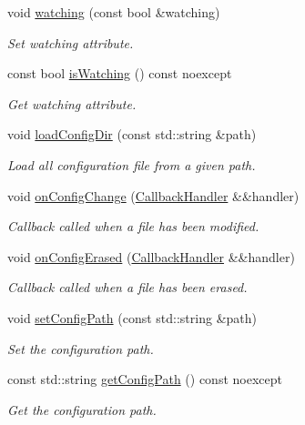 \begin{DoxyCompactItemize}
void \hyperlink{classcfg_1_1_config_manager_a5c6d63489274c7ddeb88891caea5ca48}{watching} (const bool \&watching)
\begin{DoxyCompactList}\small\item\em Set watching attribute. \end{DoxyCompactList}\item 
const bool \hyperlink{classcfg_1_1_config_manager_a704e8f6b81715a24199f3579a946cad4}{is\+Watching} () const noexcept
\begin{DoxyCompactList}\small\item\em Get watching attribute. \end{DoxyCompactList}\item 
void \hyperlink{classcfg_1_1_config_manager_ad6c55b0413f949cc5002467cbcee3186}{load\+Config\+Dir} (const std\+::string \&path)
\begin{DoxyCompactList}\small\item\em Load all configuration file from a given path. \end{DoxyCompactList}\item 
void \hyperlink{classcfg_1_1_config_manager_a324ba63493aefb579500f7338bd477db}{on\+Config\+Change} (\hyperlink{classcfg_1_1_config_manager_a6614f22d32db38ce6d6ed5b351d4f628}{Callback\+Handler} \&\&handler)
\begin{DoxyCompactList}\small\item\em Callback called when a file has been modified. \end{DoxyCompactList}\item 
void \hyperlink{classcfg_1_1_config_manager_abee2ba9f508be9604bf91d7f90691bcf}{on\+Config\+Erased} (\hyperlink{classcfg_1_1_config_manager_a6614f22d32db38ce6d6ed5b351d4f628}{Callback\+Handler} \&\&handler)
\begin{DoxyCompactList}\small\item\em Callback called when a file has been erased. \end{DoxyCompactList}\item 
void \hyperlink{classcfg_1_1_config_manager_adf39406f57dfd1871ee974dd86d16abc}{set\+Config\+Path} (const std\+::string \&path)
\begin{DoxyCompactList}\small\item\em Set the configuration path. \end{DoxyCompactList}\item 
const std\+::string \hyperlink{classcfg_1_1_config_manager_af80e94a2a93aa7bb16c2fca5249936ac}{get\+Config\+Path} () const noexcept
\begin{DoxyCompactList}\small\item\em Get the configuration path. \end{DoxyCompactList}\item 

\end{DoxyCompactItemize}
